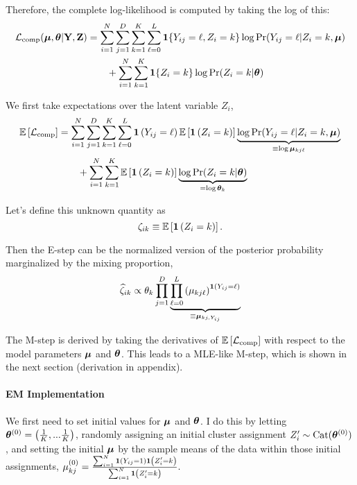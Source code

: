 \documentclass[11pt]{article}
\begin{document}
Therefore, the complete log-likelihood is computed by taking the log of this:
\begin{align}
\mathcal{L}_{\text{comp}}(\bm{\mu}, \bm{\theta}|\mathbf{Y}, \mathbf{Z})
& = \sum^{N}_{i=1}\sum^{D}_{j=1}\sum^{K}_{k=1}\sum^{L}_{\ell = 0}
\bm{1}\{Y_{ij} = \ell, Z_{i} = k\}
\log \Pr(Y_{ij} = \ell | Z_{i} = k, \bm{\mu})\nonumber\\
& \qquad +
\sum^N_{i=1}\sum^{K}_{k=1}\bm{1}\{Z_{i} = k\}\log \Pr(Z_{i} = k | \bm{\theta})
\end{align}

We first take expectations over the latent variable $Z_{i}$,
\begin{align}
\mathbb{E}\left[\mathcal{L}_{\text{comp}}\right]
& = \sum^{N}_{i=1}\sum^{D}_{j=1}\sum^{K}_{k=1}\sum^{L}_{\ell = 0}
\bm{1}\left(Y_{ij} = \ell\right) \mathbb{E}\left[\bm{1}\left(Z_{i} = k\right)\right]
\underbrace{\log \Pr(Y_{ij} = \ell | Z_{i} = k, \bm{\mu})}_{\equiv \log\bm{\mu}_{kj\ell}}
\nonumber\\
& \qquad +
\sum^{N}_{i=1}\sum^{K}_{k=1}\mathbb{E}\left[\bm{1}\left(Z_{i} = k\right)\right]\underbrace{\log \Pr(Z_{i} = k | \bm{\theta})}_{= \log \bm{\theta}_{k}} \label{eq:Elik}
\end{align}

 Let's define this unknown quantity as 
\[\zeta_{ik} \equiv \mathbb{E}\left[\bm{1}\left(Z_i = k\right)\right].\]

Then the E-step can be the normalized version of the posterior probability marginalized by the mixing proportion,
\begin{align}
\widehat{\zeta}_{ik} \propto \theta_k\prod^D_{j = 1}\underbrace{\prod^{L}_{\ell = 0}\left(\mu_{kj\ell}\right)^{\bm{1}\left(Y_{ij} = \ell\right)}}_{\equiv \bm{\mu}_{kj, Y_{ij}}}
\end{align}

The M-step is derived by taking the derivatives of \(\mathbb{E}\left[\mathcal{L}_{\text{comp}}\right]\) with respect to the model parameters \(\bm{\mu}\) and \(\bm{\theta}\). This leads to a MLE-like M-step, which is shown in the next section (derivation in appendix).


\paragraph{EM Implementation} We first need to set initial values for \(\bm{\mu}\) and \(\bm{\theta}\). I do this by letting \(\bm{\theta}^{(0)} = \left(\frac{1}{K},...\frac{1}{K}\right)\), randomly assigning an initial cluster assignment \(Z_i^\prime \sim \text{Cat}(\bm{\theta}^{(0)})\), and setting the initial \(\bm{\mu}\) by the sample means of the data within those initial assignments, \(\mu_{kj}^{(0)} = \frac{\sum_{i=1}^{N}\bm{1}\left(Y_{ij} = 1\right)\bm{1}\left(Z_{i}^{\prime} = k\right)}{\sum_{i=1}^{N}\bm{1}\left(Z_{i}^{\prime} = k\right)}.\) 
\end{document}

